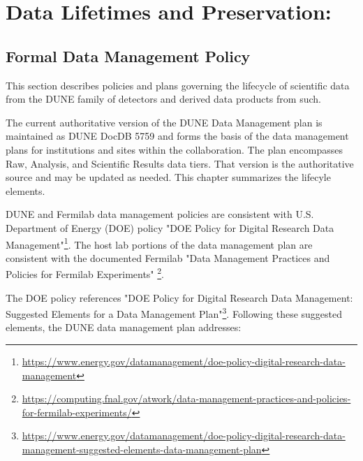 \documentclass[../main-v1.tex]{subfiles}
\begin{document}
\chapter{Data Lifetimes and Preservation: }
\label{ch:pres}

\section{Formal Data Management Policy}

This section describes policies and plans governing the lifecycle of scientific data from the DUNE family of detectors and derived data products from such.

The current authoritative version of the DUNE Data Management plan is maintained as DUNE DocDB 5759
\cite{bib:docdb5759} and forms the basis of the data management plans for institutions and sites within the collaboration.
The plan encompasses Raw, Analysis, and Scientific Results data tiers.  That version is the authoritative source and may be updated as needed.  This chapter summarizes the lifecyle elements.

DUNE and Fermilab data management policies are consistent with U.S. Department of Energy (DOE) policy "DOE Policy for Digital Research Data Management"\footnote{
\href{https://www.energy.gov/datamanagement/doe-policy-digital-research-data-management}{https://www.energy.gov/datamanagement/doe-policy-digital-research-data-management}}.
The host lab portions of the data management plan are consistent with the documented Fermilab "Data Management Practices and Policies for Fermilab Experiments"
\footnote{\href{https://computing.fnal.gov/atwork/data-management-practices-and-policies-for-fermilab-experiments/}{https://computing.fnal.gov/atwork/data-management-practices-and-policies-for-fermilab-experiments/}}.

The DOE policy references "DOE Policy for Digital Research Data Management: Suggested Elements for a Data Management Plan"\footnote{
\href{https://www.energy.gov/datamanagement/doe-policy-digital-research-data-management-suggested-elements-data-management-plan}{https://www.energy.gov/datamanagement/doe-policy-digital-research-data-management-suggested-elements-data-management-plan}}.
Following these suggested elements, the DUNE data management plan addresses:
\end{document}
